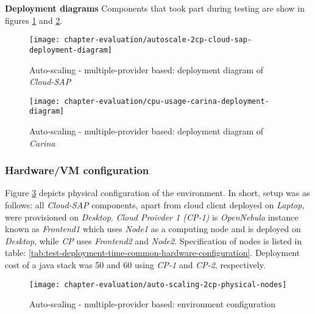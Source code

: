 \begin{asparaenum}
  
  
  \item[\textbf{Deployment diagrams}] Components that took part during testing are show in figures \ref{fig:autoscale-2cp-cloud-sap-deployment-diagram} and \ref{fig:auto-scaling-2cp-carina-deployment-diagram}.

  \begin{figure}[!ht]
    \begin{center}
      \texttt{[image: chapter-evaluation/autoscale-2cp-cloud-sap-deployment-diagram]}
    \end{center}
    \caption{Auto-scaling - multiple-provider based: deployment diagram of \emph{Cloud-SAP}}
    \label{fig:autoscale-2cp-cloud-sap-deployment-diagram}
  \end{figure}
  
  \begin{figure}[!ht]
    \begin{center}
      \texttt{[image: chapter-evaluation/cpu-usage-carina-deployment-diagram]}
    \end{center}
    \caption{Auto-scaling - multiple-provider based: deployment diagram of \emph{Carina}}
    \label{fig:auto-scaling-2cp-carina-deployment-diagram}
  \end{figure}
\end{asparaenum}

\subsubsection*{Hardware/VM configuration}

Figure \ref{fig:auto-scaling-2cp-physical-nodes} depicts physical configuration of the environment. In short, setup was as follows: all \emph{Cloud-SAP} components, apart from cloud client deployed on \emph{Laptop}, were provisioned on \emph{Desktop}. \emph{Cloud Proivder 1 (CP-1)} is \emph{OpenNebula} instance known as \emph{Frontend1} which uses \emph{Node1} as a computing node and is deployed on \emph{Desktop}, while \emph{CP} uses \emph{Frontend2} and \emph{Node2}. Specification of nodes is listed in table: \ref{tab:test-deployment-time-common-hardware-configuration}. Deployment cost of a java stack was 50 and 60 using \emph{CP-1} and \emph{CP-2}, respectively.

\begin{figure}[!ht]
  \begin{center}
    \texttt{[image: chapter-evaluation/auto-scaling-2cp-physical-nodes]}
  \end{center}
  \caption{Auto-scaling - multiple-provider based: environment configuration}
  \label{fig:auto-scaling-2cp-physical-nodes}
\end{figure}

